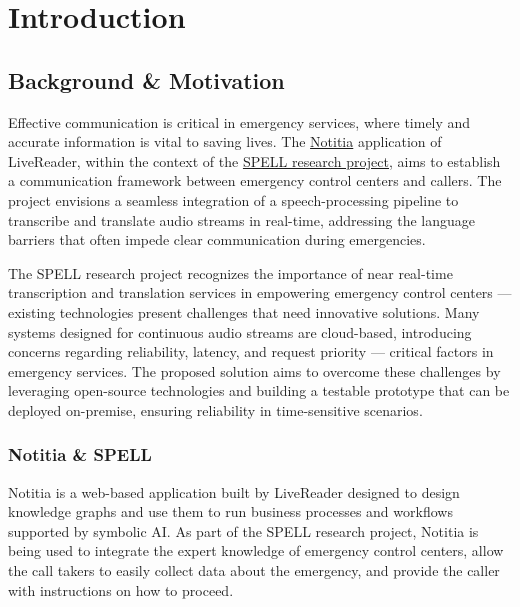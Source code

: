 \chapter{Introduction}

\label{Introduction}


\section{Background \& Motivation}

Effective communication is critical in emergency services, where timely and accurate information is vital to 
saving lives. The \href{https://notitia.world/}{Notitia} application of LiveReader, within the context of the 
\href{https://spell-plattform.de/}{SPELL research project}, aims to establish a communication framework between 
emergency control centers and callers. The project envisions a seamless integration of a speech-processing pipeline to 
transcribe and translate audio streams in real-time, addressing the language barriers that often impede clear 
communication during emergencies.

The SPELL research project recognizes the importance of near real-time transcription and translation services in 
empowering emergency control centers — existing technologies present challenges that need innovative solutions. 
Many systems designed for continuous audio streams are cloud-based, introducing concerns regarding reliability, 
latency, and request priority — critical factors in emergency services. The proposed solution aims to 
overcome these challenges by leveraging open-source technologies and building a testable prototype that can be deployed 
on-premise, ensuring reliability in time-sensitive scenarios.

\subsection{Notitia \& SPELL}

Notitia is a web-based application built by LiveReader designed to design knowledge graphs and use them to run business 
processes and workflows supported by symbolic AI. As part of the SPELL research project, Notitia is being used to 
integrate the expert knowledge of emergency control centers, allow the call takers to easily collect data about the 
emergency, and provide the caller with instructions on how to proceed.

